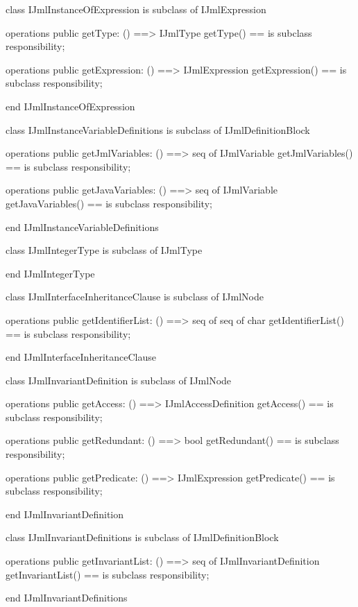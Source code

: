 \begin{vdm_al}
class IJmlInstanceOfExpression
 is subclass of IJmlExpression

operations
  public getType: () ==> IJmlType
  getType() == is subclass responsibility;

operations
  public getExpression: () ==> IJmlExpression
  getExpression() == is subclass responsibility;

end IJmlInstanceOfExpression
\end{vdm_al}

\begin{vdm_al}
class IJmlInstanceVariableDefinitions
 is subclass of IJmlDefinitionBlock

operations
  public getJmlVariables: () ==> seq of IJmlVariable
  getJmlVariables() == is subclass responsibility;

operations
  public getJavaVariables: () ==> seq of IJmlVariable
  getJavaVariables() == is subclass responsibility;

end IJmlInstanceVariableDefinitions
\end{vdm_al}

\begin{vdm_al}
class IJmlIntegerType
 is subclass of IJmlType

end IJmlIntegerType
\end{vdm_al}

\begin{vdm_al}
class IJmlInterfaceInheritanceClause
 is subclass of IJmlNode

operations
  public getIdentifierList: () ==> seq of seq of char
  getIdentifierList() == is subclass responsibility;

end IJmlInterfaceInheritanceClause
\end{vdm_al}

\begin{vdm_al}
class IJmlInvariantDefinition
 is subclass of IJmlNode

operations
  public getAccess: () ==> IJmlAccessDefinition
  getAccess() == is subclass responsibility;

operations
  public getRedundant: () ==> bool
  getRedundant() == is subclass responsibility;

operations
  public getPredicate: () ==> IJmlExpression
  getPredicate() == is subclass responsibility;

end IJmlInvariantDefinition
\end{vdm_al}

\begin{vdm_al}
class IJmlInvariantDefinitions
 is subclass of IJmlDefinitionBlock

operations
  public getInvariantList: () ==> seq of IJmlInvariantDefinition
  getInvariantList() == is subclass responsibility;

end IJmlInvariantDefinitions
\end{vdm_al}

